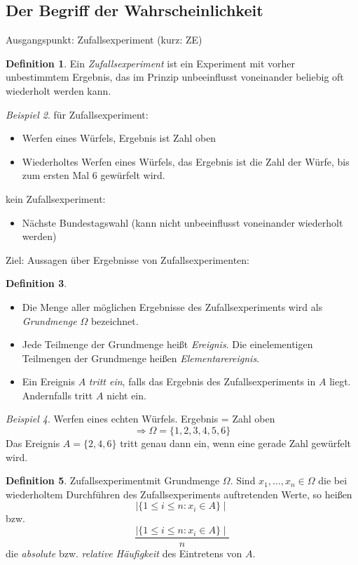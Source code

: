 \documentclass[a4paper,12pt,fleqn]{scrartcl}
\newcommand{\ZE}{Zufallsexperiment}
\newcommand{\impl}{\Rightarrow}
\theoremstyle{definition}
\newtheorem{definition}{Definition}[section]
\theoremstyle{plain}
\theoremstyle{remark}
\newtheorem{beispiel}[definition]{Beispiel}
\begin{document}
\subsection{Der Begriff der Wahrscheinlichkeit}
Ausgangspunkt: Zufallsexperiment (kurz: ZE)
\begin{definition}
Ein \emph{Zufallsexperiment} ist ein Experiment mit vorher unbestimmtem Ergebnis, das im Prinzip unbeeinflusst voneinander beliebig oft wiederholt werden kann.
\end{definition}
\begin{beispiel}
für \ZE:
\begin{itemize}
\item Werfen eines Würfels, Ergebnis ist Zahl oben
\item Wiederholtes Werfen eines Würfels, das Ergebnis ist die Zahl der Würfe, bis zum ersten Mal $6$ gewürfelt wird.
\end{itemize}
kein \ZE:
\begin{itemize}
\item Nächste Bundestagswahl (kann nicht unbeeinflusst voneinander wiederholt werden)
\end{itemize}
\end{beispiel}
Ziel: Aussagen über Ergebnisse von \ZE en:
\begin{definition}
\begin{itemize}
\item Die Menge aller möglichen Ergebnisse des \ZE s wird als \emph{Grundmenge} $\Omega$ bezeichnet.
\item Jede Teilmenge der Grundmenge heißt \emph{Ereignis}. Die einelementigen Teilmengen der Grundmenge heißen \emph{Elementarereignis}.
\item Ein Ereignis $A$ \emph{tritt ein}, falls das Ergebnis des Zufallsexperiments in $A$ liegt. Andernfalls tritt $A$ nicht ein.
\end{itemize}
\end{definition}
\begin{beispiel}
Werfen eines echten Würfels. Ergebnis = Zahl oben
\[\impl\Omega=\{ 1,2,3,4,5,6\}\]
Das Ereignis $A=\{ 2,4,6\}$ tritt genau dann ein, wenn eine gerade Zahl gewürfelt wird.
\end{beispiel}
\begin{definition}
\ZE mit Grundmenge $\Omega$. Sind $x_1,\ldots,x_n\in\Omega$ die bei wiederholtem Durchführen des \ZE s auftretenden Werte, so heißen
\[\mid \{ 1\leq i\leq n:x_i\in A\}\mid\]
bzw.
\[\frac{\mid \{ 1\leq i\leq n:x_i\in A\}\mid}{n}\]
die \emph{absolute} bzw. \emph{relative Häufigkeit} des Eintretens von $A$.
\end{definition}
\end{document}

